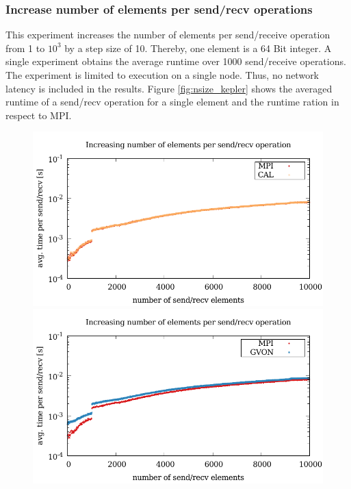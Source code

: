 \subsubsection*{Increase number of elements per send/recv operations}
This experiment increases the number of elements per send/receive
operation from 1 to $10^3$ by a step size of 10. Thereby, one element is
a 64 Bit integer. A single experiment obtains the average runtime over
1000 send/receive operations.  The experiment is limited to execution
on a single node. Thus, no network latency is included in the
results. Figure \ref{fig:nsize_kepler} shows the averaged runtime of a
send/recv operation for a single element and the runtime ration in
respect to MPI.

\begin{figure}[H]
  \begin{minipage}[t]{0.5\textwidth}
    \includegraphics[width=\textwidth]{plots/50_nsize_cal_kepler}
    \includegraphics[width=\textwidth]{plots/50_nsize_gvon_kepler}

\end{minipage}
\end{figure}
